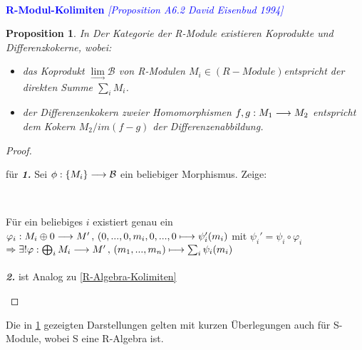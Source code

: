 \documentclass[10pt,a4paper]{report}
\newcommand{\ModulsOfDifferenzials}{David Eisenbud 1994}
\newcounter{Aussage}[chapter]
\newtheorem{prop}[Aussage]{Proposition}
\newcommand{\functionfront}[3]{\nolinebreak{#1:#2 \longrightarrow #3}}
\newcommand{\function}[5]{\nolinebreak{#1:#2 \longrightarrow #3 \, , \, #4 \longmapsto #5}}
\newcommand{\colimes}[0]{\lim\limits_{ \longrightarrow }}
\newcommand{\immage}[1]{im(#1)}
\begin{document}
\ \\
\textcolor{blue}{\textbf{R-Modul-Kolimiten} \textit{[Proposition A6.2 \ModulsOfDifferenzials]}}
\begin{prop}\label{R-Modul-Kolimiten}
In Der Kategorie der R-Module  existieren Koprodukte und Differenzkokerne, wobei:
\begin{itemize}
\item[\textbf{1.}] das Koprodukt $\colimes \mathcal{B}$ von R-Modulen $M_i \in (R-Module)$entspricht der direkten Summe $\sum_i M_i$.
\item[\textbf{2.}] der Differenzenkokern zweier Homomorphismen $\functionfront{f,g}{M_1}{M_2}$ entspricht dem Kokern $M_2/\immage{f-g}$ der Differenzenabbildung.
\end{itemize}
\end{prop}
\begin{proof}
\begin{itemize}

für \textit{\textbf{1.}} Sei $\functionfront{\phi}{\lbrace M_i \rbrace}{\mathcal{B}}$ ein beliebiger Morphismus. Zeige: \\
\begin{center}
\\
\end{center}
Für ein beliebiges $i$ existiert genau ein $\function{\varphi_i}{M_i \oplus 0}{M'}{(0,...,0,m_i,0,...,0}{\psi_i '(m_i)}$
 mit $\psi_i ' = \psi_i \circ \varphi_i$\\
$\Rightarrow  \exists ! \function{\varphi}{\bigoplus_i M_i}{M'}{(m_1,...,m_n)}{\sum_i \psi_i(m_i)}$\\
\ \\
\textit{\textbf{2.}} ist Analog zu \cref{R-Algebra-Kolimiten}
\end{itemize}
\end{proof}
Die in \cref{R-Modul-Kolimiten} gezeigten Darstellungen gelten mit kurzen Überlegungen auch für S-Module, wobei S eine R-Algebra ist.\\
\end{document}
